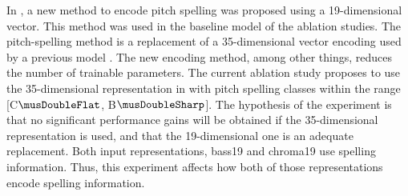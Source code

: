 
In , a new method to encode
pitch spelling was proposed using a 19-dimensional vector.
This method was used in the baseline model of the ablation
studies. The pitch-spelling method is a replacement of a
35-dimensional vector encoding used by a previous model
\parencite{micchi2021deep}. The new encoding method, among
other things, reduces the number of trainable parameters.
The current ablation study proposes to use the
35-dimensional representation in \textcite{micchi2021deep}
with pitch spelling classes within the range
[C$\musDoubleFlat$, B$\musDoubleSharp$]. The hypothesis of
the experiment is that no significant performance gains will
be obtained if the 35-dimensional representation is used,
and that the 19-dimensional one is an adequate replacement.
Both input representations, \gls{bass19} and \gls{chroma19}
use spelling information. Thus, this experiment affects how
both of those representations encode spelling information.
